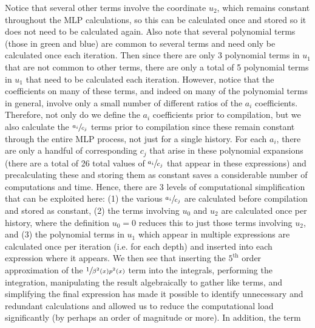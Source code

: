 \documentclass[a4paper,landscape]{article}
\begin{document}
Notice that several other terms involve the coordinate $u_2$, which remains constant throughout the MLP calculations, so this can be calculated once and stored so it does not need to be calculated again. Also note that several polynomial terms (those in green and blue) are common to several terms and need only be calculated once each iteration.  Then since there are only 3 polynomial terms in $u_1$ that are not common to other terms, there are only a total of 5 polynomial terms in $u_1$ that need to be calculated each iteration.  However, notice that the coefficients on many of these terms, and indeed on many of the polynomial terms in general, involve only a small number of different ratios of the $a_i$ coefficients.  Therefore, not only do we define the $a_i$ coefficients prior to compilation, but we also calculate the $\sfrac{a_i}{c_j}$ terms prior to compilation since these remain constant through the entire MLP process, not just for a single history.  For each $a_i$, there are only a handful of corresponding $c_j$ that arise in these polynomial expansions (there are a total of 26 total values of $\sfrac{a_i}{c_j}$ that appear in these expressions) and precalculating these and storing them as constant saves a considerable number of computations and time.  Hence, there are 3 levels of computational simplification that can be exploited here: (1) the various $\sfrac{a_i}{c_j}$ are calculated before compilation and stored as constant, (2) the terms involving $u_0$ and $u_2$ are calculated once per history, where the definition $u_0=0$ reduces this to just those terms involving $u_2$, and (3) the polynomial terms in $u_1$ which appear in multiple expressions are calculated once per iteration (i.e. for each depth) and inserted into each expression where it appears.  We then see that inserting the $5^{\text{th}}$ order approximation of the $\sfrac{1}{\beta^2(x)p^2(x)}$ term into the integrals, performing the integration, manipulating the result algebraically to gather like terms, and simplifying the final expression has made it possible to identify unnecessary and redundant calculations and allowed us to reduce the computational load significantly (by perhaps an order of magnitude or more).
In addition, the term
\end{document}
